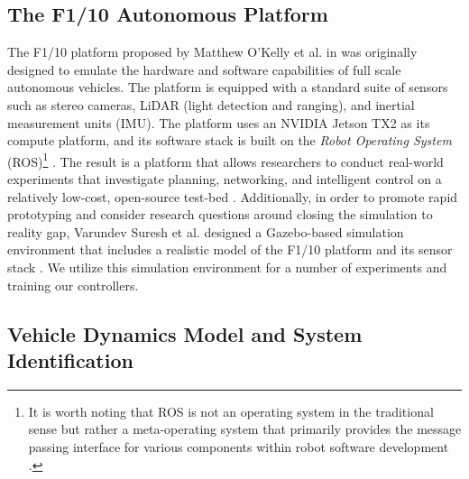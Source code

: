 \documentclass[manuscript,screen,review]{acmart}
\newcommand{\todo}[1]{\textcolor{red}{\textbf{\underline{TODO:}} #1}}
\begin{document}

\subsection{The F1/10 Autonomous Platform}

The F1/10 platform proposed by Matthew O'Kelly et al. in \cite{F1102019} was originally designed to emulate the hardware and software capabilities of full scale autonomous vehicles. The platform is equipped with a standard suite of sensors such as stereo cameras, LiDAR (light detection and ranging), and inertial measurement units (IMU). The platform uses an NVIDIA Jetson TX2 as its compute platform, and its software stack is built on the \emph{Robot Operating System} (ROS)\footnote{It is worth noting that ROS is not an operating system in the traditional sense but rather a meta-operating system that primarily provides the message passing interface for various components within robot software development \cite{Huang2014}.} \cite{ROS}. The result is a platform that allows researchers to conduct real-world experiments that investigate planning, networking, and intelligent control on a relatively low-cost, open-source test-bed \cite{F1102019}. Additionally, in order to promote rapid prototyping and consider research questions around closing the simulation to reality gap\cite{Muratore2019}, Varundev Suresh et al. designed a Gazebo-based simulation environment \cite{Gazebo} that includes a realistic model of the F1/10 platform and its sensor stack \cite{varundev_ros_19}. We utilize this simulation environment for a number of experiments and training our controllers.


\subsection{Vehicle Dynamics Model and System Identification}
\end{document}
